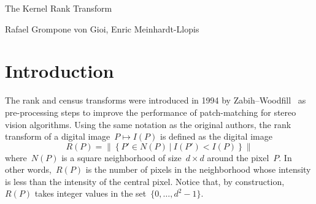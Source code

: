 \documentclass[12pt]{article}                  %
\begin{document}
\begin{center}
	\Huge The Kernel Rank Transform

	\large Rafael Grompone von Gioi, Enric Meinhardt-Llopis
\end{center}

\bigskip

\begin{abstract}
	We propose a generalization of the classical rank transform of
	image processing, where the square neighborhood is replaced by an
	arbitrary weight kernel.  We prove the main structural properties of this
	operator: it is contrast-invariant, its infinitesimal generator is the
	curvature of level lines, and it has a noise-uniformization property: it
	transforms white noise into uniform noise.  Since contrast-invariant
	operators are necessarily discontinuous, we provide a continuous
	version of the operator that is numerically invariant to contrast changes
	of limited slope.
	We discuss several applications, and its relationship to other operations:
	noise whitening transforms, local contrast equalization, bilateral
	filtering
\end{abstract}

\bigskip

\section{Introduction}

The rank and census transforms were introduced in 1994 by
Zabih--Woodfill~\cite{ZW} as pre-processing steps to improve the performance
of patch-matching for stereo vision algorithms.
Using the same notation as the original authors, the rank transform of a
digital image~$P\mapsto I(P)$ is defined as the
digital image
\begin{equation}\label{eq:rt}
	R(P) = \left\|\left\{
		P'\in N(P)\ |\ I(P')< I(P)
	\right\}\right\|
\end{equation}
where~$N(P)$ is a square neighborhood of size~$d\times d$ around the pixel~$P$.
In other words,~$R(P)$ is the number of pixels in the neighborhood
whose intensity is less than the intensity of the central pixel.
Notice that, by construction,~$R(P)$ takes integer values in the
set~$\{0,\ldots,d^2-1\}$.
\end{document}
